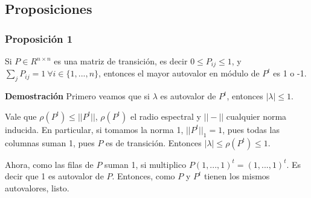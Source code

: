 \subsection{Proposiciones}

\subsubsection{Proposición 1}
\label{subsub:prop1}
Si $P \in R^{n\times n}$ es una matriz de transición, es decir $0 \leq P_{ij} \leq 1$, y $\sum_j P_{ij} = 1 \ \forall i\in\{1,...,n\}$, entonces el mayor autovalor en módulo de $P^t$ es 1 o -1.

\textbf{Demostración} Primero veamos que si $\lambda$ es autovalor de $P^t$, entonces $|\lambda| \leq 1$.

Vale que $\rho(P^t) \leq ||P^t||$, $\rho(P^t)$ el radio espectral y $||-||$ cualquier norma inducida. En particular, si tomamos la norma 1, $||P^t||_1 = 1$, pues todas las columnas suman 1, pues $P$ es de transición. Entonces $|\lambda| \leq \rho(P^t) \leq 1$.

Ahora, como las filas de $P$ suman 1, si multiplico $P (1, ..., 1)^t = (1, ..., 1)^t$. Es decir que 1 es autovalor de $P$. Entonces, como $P$ y $P^t$ tienen los mismos autovalores, listo.



\newpage
\nocite{*}
\printbibliography


